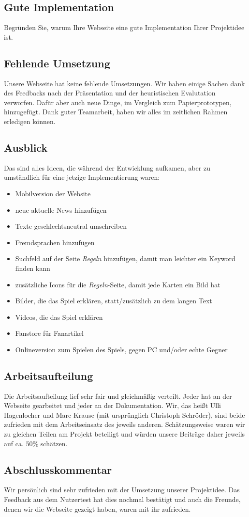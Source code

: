 \documentclass{scrartcl}
\begin{document}
\subsection*{Gute Implementation}
 Begründen Sie, warum Ihre Webseite eine gute
Implementation Ihrer Projektidee ist.

 \subsection*{Fehlende Umsetzung}
Unsere Webseite hat keine fehlende Umsetzungen. Wir haben einige Sachen dank des Feedbacks nach der Präsentation und der heuristischen Evalutation verworfen. Dafür aber auch neue Dinge, im Vergleich zum Papierprototypen, hinzugefügt. Dank guter Teamarbeit, haben wir alles im zeitlichen Rahmen erledigen können.

 \subsection*{Ausblick} 
 Das sind alles Ideen, die während der Entwicklung aufkamen, aber zu umständlich für eine jetzige Implementierung waren:
 \begin{itemize}
 \item Mobilversion der Website
\item neue aktuelle News hinzufügen
\item Texte geschlechtsneutral umschreiben
\item Fremdsprachen hinzufügen
\item Suchfeld auf der Seite \textit{Regeln} hinzufügen, damit man leichter ein Keyword finden kann
\item zusätzliche Icons für die \textit{Regeln}-Seite, damit jede Karten ein Bild hat
\item Bilder, die das Spiel erklären, statt/zusätzlich zu dem langen Text
\item Videos, die das Spiel erklären
\item Fanstore für Fanartikel
\item Onlineversion zum Spielen des Spiels, gegen PC und/oder echte Gegner
 \end{itemize}

\subsection*{Arbeitsaufteilung}

Die Arbeitsaufteilung lief sehr fair und gleichmäßig verteilt. Jeder hat an der Webseite gearbeitet und jeder an der Dokumentation. Wir, das heißt Ulli Hagenlocher und Marc Krause (mit ursprünglich Christoph Schröder), sind beide zufrieden mit dem Arbeitseinsatz des jeweils anderen. Schätzungsweise waren wir zu gleichen Teilen am Projekt beteiligt und würden unsere Beiträge daher jeweils auf ca. 50\% schätzen.

\subsection*{Abschlusskommentar}
Wir persönlich sind sehr zufrieden mit der Umsetzung unserer Projektidee. Das Feedback aus dem Nutzertest hat dies nochmal bestätigt und auch die Freunde, denen wir die Webseite gezeigt haben, waren mit ihr zufrieden.
\end{document}
